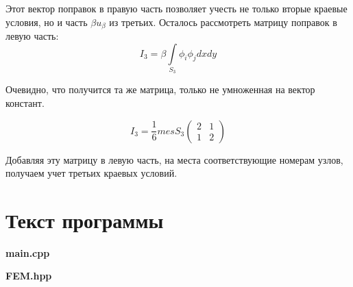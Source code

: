 \documentclass[12pt,a4paper]{article}
\begin{document}
\noindent Этот вектор поправок в правую
часть позволяет учесть не только вторые
краевые условия, но и часть
$\beta u_{\beta}$ из третьих.
Осталось рассмотреть матрицу
поправок в левую часть:
$$
I_3 = \beta \int \limits_{S_3}
\phi_i \phi_j dxdy
$$

\noindent Очевидно, что получится та же
матрица, только не умноженная на вектор
констант.

$$
I_3 = \frac{1}{6} mes S_3
\begin{pmatrix}
    2 & 1 \\
    1 & 2
\end{pmatrix}
$$

\noindent Добавляя эту матрицу в левую часть,
на места соответствующие номерам узлов,
получаем учет третьих краевых условий.


\section{Текст программы}
\begin{myquote}
    \begin{center}
        \textbf{main.cpp}
    \end{center}
\end{myquote}

\begin{myquote}
    \begin{center}
        \textbf{FEM.hpp}
    \end{center}
\end{myquote}
\end{document}
